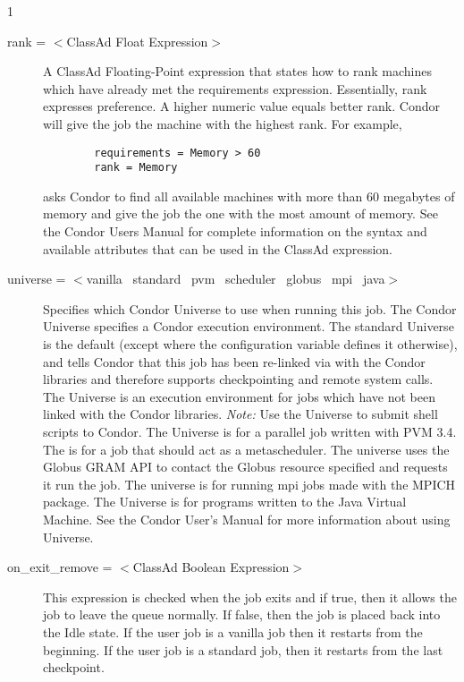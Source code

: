 \begin{ManPage}{\label{man-condor-submit}}{1}
\begin{description}
\item[rank = $<$ClassAd Float Expression$>$] A ClassAd Floating-Point 
expression that states how to rank machines which have already met the requirements
expression. Essentially, rank expresses preference.  A higher numeric value 
equals better rank. Condor will give the job the machine with the 
highest rank.  For example,
\begin{verbatim}
        requirements = Memory > 60
        rank = Memory
\end{verbatim}
asks Condor to find all available machines with more than 60 megabytes of memory
and give the job the one with the most amount of memory.  See the Condor Users
Manual for complete information on the syntax and available attributes
that can be used in the ClassAd expression.


\item[universe = $<$vanilla \Bar\ standard \Bar\ pvm \Bar\ scheduler
\Bar\ globus \Bar\ mpi \Bar\ java$>$] 
Specifies which Condor Universe to use when running this job.  The Condor 
Universe specifies a Condor execution environment.  The standard 
Universe is the default (except where the configuration variable
 defines it otherwise),
and tells Condor that this job has been re-linked 
via  with the Condor libraries and therefore supports
checkpointing and remote system calls.  The  Universe is an
execution environment for jobs which have not been linked with the
Condor libraries.  \emph{Note:} Use the  Universe to
submit shell scripts to Condor.  The  Universe is for a
parallel job written with PVM 3.4. The  is for a job that
should act as a metascheduler.
The  universe uses the Globus
GRAM API to contact the Globus resource specified and requests it run the job.
The  universe is
for running mpi jobs made with the MPICH package.
The  Universe is for programs written to the Java Virtual Machine.
See the Condor User's Manual for more information about using Universe.


\item[on\_exit\_remove = $<$ClassAd Boolean Expression$>$] This expression
is checked when the job exits and if true, then it allows the job to leave the
queue normally. If false, then the job is placed back into the Idle state.
If the user job is a vanilla job then it restarts from the beginning. If the
user job is a standard job, then it restarts from the last checkpoint.


\end{description}
\end{ManPage}
